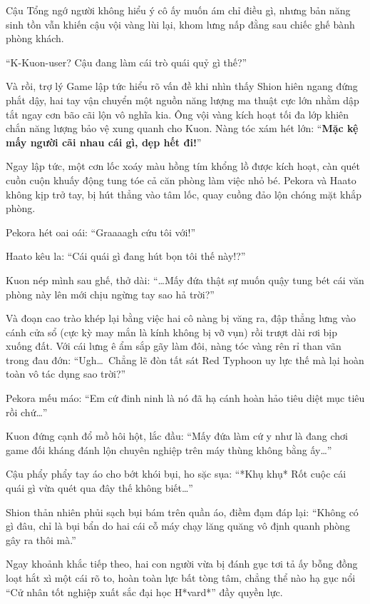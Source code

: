 \documentclass[../main.tex]{subfiles}
\begin{document}
Cậu Tổng ngớ người không hiểu ý cô ấy muốn ám chỉ điều gì, nhưng bản năng sinh tồn vẫn khiến cậu vội vàng lùi lại, khom lưng nấp đằng sau chiếc ghế bành phòng khách.

``K-Kuon-user? Cậu đang làm cái trò quái quỷ gì thế?''

Và rồi, trợ lý Game lập tức hiểu rõ vấn đề khi nhìn thấy Shion hiên ngang đứng phắt dậy, hai tay vận chuyển một nguồn năng lượng ma thuật cực lớn nhằm dập tắt ngay cơn bão cãi lộn vô nghĩa kia. Ông vội vàng kích hoạt tối đa lớp khiên chắn năng lượng bảo vệ xung quanh cho Kuon. Nàng tóc xám hét lớn: ``\textbf{Mặc kệ mấy người cãi nhau cái gì, dẹp hết đi!}''


Ngay lập tức, một cơn lốc xoáy màu hồng tím khổng lồ được kích hoạt, càn quét cuồn cuộn khuấy động tung tóe cả căn phòng làm việc nhỏ bé. Pekora và Haato không kịp trở tay, bị hút thẳng vào tâm lốc, quay cuồng đảo lộn chóng mặt khắp phòng.

Pekora hét oai oái: ``Graaaagh cứu tôi với!''

Haato kêu la: ``Cái quái gì đang hút bọn tôi thế này!?''

Kuon nép mình sau ghế, thở dài: ``\dots Mấy đứa thật sự muốn quậy tung bét cái văn phòng này lên mới chịu ngừng tay sao hả trời?''

Và đoạn cao trào khép lại bằng việc hai cô nàng bị văng ra, đập thẳng lưng vào cánh cửa sổ (cực kỳ may mắn là kính không bị vỡ vụn) rồi trượt dài rơi bịp xuống đất. Với cái lưng ê ẩm sắp gãy làm đôi, nàng tóc vàng rên rỉ than vãn trong đau đớn: ``Ugh\dots\ Chẳng lẽ đòn tất sát Red Typhoon uy lực thế mà lại hoàn toàn vô tác dụng sao trời?''


Pekora mếu máo: ``Em cứ đinh ninh là nó đã hạ cánh hoàn hảo tiêu diệt mục tiêu rồi chứ\dots''

Kuon đứng cạnh đổ mồ hôi hột, lắc đầu: ``Mấy đứa làm cứ y như là đang chơi game đối kháng đánh lộn chuyên nghiệp trên máy thùng không bằng ấy\dots''

Cậu phẩy phẩy tay áo cho bớt khói bụi, ho sặc sụa: ``*Khụ khụ* Rốt cuộc cái quái gì vừa quét qua đây thế không biết\dots''

Shion thản nhiên phủi sạch bụi bám trên quần áo, điềm đạm đáp lại: ``Không có gì đâu, chỉ là bụi bẩn do hai cái cỗ máy chạy lăng quăng vô định quanh phòng gây ra thôi mà.''

Ngay khoảnh khắc tiếp theo, hai con người vừa bị đánh gục tơi tả ấy bỗng đồng loạt hắt xì một cái rõ to, hoàn toàn lực bất tòng tâm, chẳng thể nào hạ gục nổi ``Cử nhân tốt nghiệp xuất sắc đại học H*vard*'' đầy quyền lực.
\end{document}
